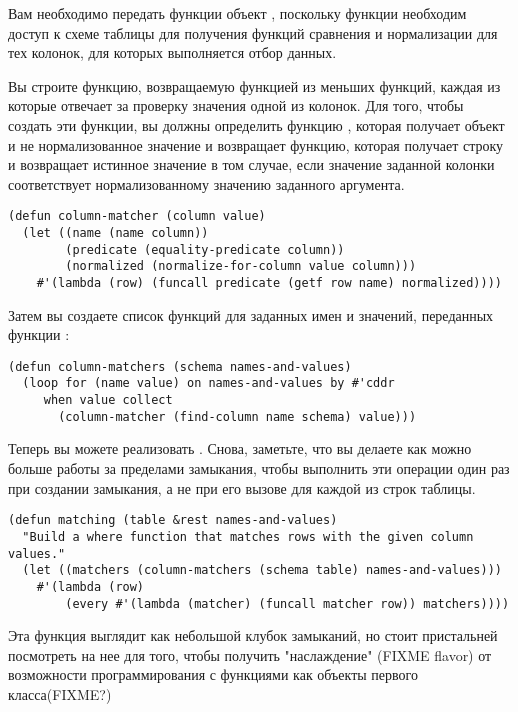 Вам необходимо передать функции  объект , поскольку функции
необходим доступ к схеме таблицы для получения функций сравнения и нормализации для тех
колонок, для которых выполняется отбор данных.

Вы строите функцию, возвращаемую функцией  из меньших функций, каждая из
которые отвечает за проверку значения одной из колонок.  Для того, чтобы создать эти
функции, вы должны определить функцию , которая получает объект
 и не нормализованное значение и возвращает функцию, которая получает строку
и возвращает истинное значение в том случае, если значение заданной колонки соответствует
нормализованному значению заданного аргумента.

\begin{lstlisting}
(defun column-matcher (column value)
  (let ((name (name column))
        (predicate (equality-predicate column))
        (normalized (normalize-for-column value column)))
    #'(lambda (row) (funcall predicate (getf row name) normalized))))
\end{lstlisting}

Затем вы создаете список функций  для заданных имен и значений,
переданных функции :

\begin{lstlisting}
(defun column-matchers (schema names-and-values)
  (loop for (name value) on names-and-values by #'cddr
     when value collect
       (column-matcher (find-column name schema) value)))
\end{lstlisting}

Теперь вы можете реализовать .  Снова, заметьте, что вы делаете как можно
больше работы за пределами замыкания, чтобы выполнить эти операции один раз при создании
замыкания, а не при его вызове для каждой из строк таблицы.

\begin{lstlisting}
(defun matching (table &rest names-and-values)
  "Build a where function that matches rows with the given column values."
  (let ((matchers (column-matchers (schema table) names-and-values)))
    #'(lambda (row)
        (every #'(lambda (matcher) (funcall matcher row)) matchers))))
\end{lstlisting}

Эта функция выглядит как небольшой клубок замыканий, но стоит пристальней посмотреть на
нее для того, чтобы получить "наслаждение" (FIXME flavor) от возможности программирования
с функциями как объекты первого класса(FIXME?)

